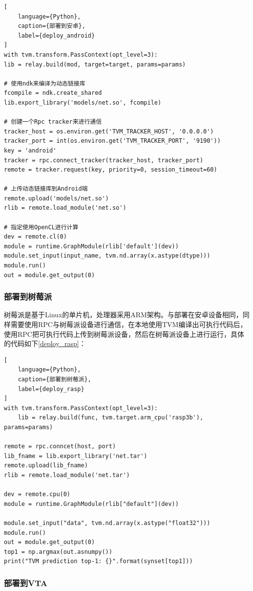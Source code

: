 \begin{lstlisting}[
    language={Python},
    caption={部署到安卓},
    label={deploy_android}
]
with tvm.transform.PassContext(opt_level=3):
lib = relay.build(mod, target=target, params=params)

# 使用ndk来编译为动态链接库
fcompile = ndk.create_shared
lib.export_library('models/net.so', fcompile)

# 创建一个Rpc tracker来进行通信
tracker_host = os.environ.get('TVM_TRACKER_HOST', '0.0.0.0')
tracker_port = int(os.environ.get('TVM_TRACKER_PORT', '9190'))
key = 'android'
tracker = rpc.connect_tracker(tracker_host, tracker_port)
remote = tracker.request(key, priority=0, session_timeout=60)

# 上传动态链接库到Android端
remote.upload('models/net.so')
rlib = remote.load_module('net.so')

# 指定使用OpenCL进行计算
dev = remote.cl(0)
module = runtime.GraphModule(rlib['default'](dev))
module.set_input(input_name, tvm.nd.array(x.astype(dtype)))
module.run()
out = module.get_output(0)
\end{lstlisting}

\subsubsection{部署到树莓派}

树莓派是基于Linux的单片机，处理器采用ARM架构。与部署在安卓设备相同，同样需要使用RPC与树莓派设备进行通信，在本地使用TVM编译出可执行代码后，使用RPC把可执行代码上传到树莓派设备，然后在树莓派设备上进行运行，具体的代码如下\ref{deploy_rasp}：

\begin{lstlisting}[
    language={Python},
    caption={部署到树莓派},
    label={deploy_rasp}
]
with tvm.transform.PassContext(opt_level=3):
    lib = relay.build(func, tvm.target.arm_cpu('rasp3b'), params=params)

remote = rpc.conncet(host, port)
lib_fname = lib.export_library('net.tar')
remote.upload(lib_fname)
rlib = remote.load_module('net.tar')

dev = remote.cpu(0)
module = runtime.GraphModule(rlib["default"](dev))

module.set_input("data", tvm.nd.array(x.astype("float32")))
module.run()
out = module.get_output(0)
top1 = np.argmax(out.asnumpy())
print("TVM prediction top-1: {}".format(synset[top1]))
\end{lstlisting}

\subsubsection{部署到VTA}

